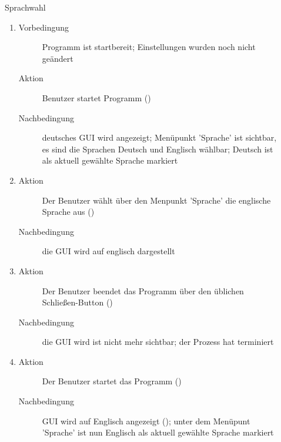 \begin{description}
	\item[] Sprachwahl
	\begin{enumerate}
		\item
		\begin{description}
			\item[Vorbedingung] Programm ist startbereit; Einstellungen wurden noch nicht geändert
			\item[Aktion] Benutzer startet Programm ()
			\item[Nachbedingung] deutsches GUI wird angezeigt; Menüpunkt 'Sprache' ist sichtbar, es sind die Sprachen Deutsch und Englisch wählbar; Deutsch ist als aktuell gewählte Sprache markiert
		\end{description}
		\item
		\begin{description}
			\item[Aktion] Der Benutzer wählt über den Menpunkt 'Sprache' die englische Sprache aus ()
			\item[Nachbedingung] die GUI wird auf englisch dargestellt
		\end{description}
		\item
		\begin{description}
			\item[Aktion] Der Benutzer beendet das Programm über den üblichen Schließen-Button ()
			\item[Nachbedingung] die GUI wird ist nicht mehr sichtbar; der Prozess hat terminiert
		\end{description}
		\item
		\begin{description}
			\item[Aktion] Der Benutzer startet das Programm ()
			\item[Nachbedingung] GUI wird auf Englisch angezeigt (); unter dem Menüpunt 'Sprache' ist nun Englisch als aktuell gewählte Sprache markiert
		\end{description}
	\end{enumerate}


\end{description}
